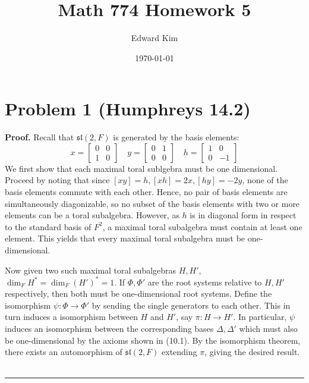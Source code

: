 \documentclass[12pt]{article}%
\newenvironment{proof}[1][Proof]{\textbf{#1.} }{\ \rule{0.5em}{0.5em}}
\begin{document}
\title{Math 774 Homework 5}
\author{Edward Kim}
\date{\today}
\maketitle

\section*{Problem 1 (Humphreys 14.2)}
\begin{proof}
  Recall that $\mathfrak{sl}(2,F)$ is generated by the basis elements:
  $$ x = \begin{bmatrix} 0 & 0 \\ 1 & 0 \end{bmatrix} \quad y = \begin{bmatrix} 0 & 1 \\ 0 & 0 \end{bmatrix} \quad h = \begin{bmatrix} 1 & 0 \\ 0 & -1 \end{bmatrix}$$
  We first show that each maximal toral sublgebra must be one dimensional. Proceed by noting that since $[xy] = h, [xh] = 2x, [hy] = -2y$, none of the basis elements commute with each other. Hence, no pair of basis elements are simultaneously diagonizable, so no subset of the basis elements with two or more elements can be a toral subalgebra. However, as $h$ is in diagonal form in respect to the standard basis of $F^2$, a maximal toral subalgebra must contain at least one element. This yields that every maximal toral subalgebra must be one-dimensional. \newline

  Now given two such maximal toral subalgebras $H,H'$, $\dim_F{H^*} = \dim_F{(H')^*} = 1$. If $\Phi,\Phi'$ are the root systems relative to $H,H'$ respectively, then both must be one-dimensional root systems. Define the isomorphism $\psi: \Phi \rightarrow \Phi'$ by sending the single generators to each other. This in turn induces a isomorphism between $H$ and $H'$, say $\pi: H \rightarrow H'$. In particular, $\psi$ induces an isomorphism between the corresponding bases $\Delta,\Delta'$ which must also be one-dimensional by the axioms shown in (10.1). By the isomorphism theorem, there exists an automorphism of $\mathfrak{sl}(2,F)$ extending $\pi$, giving the desired result.
\end{proof}
\end{document}
